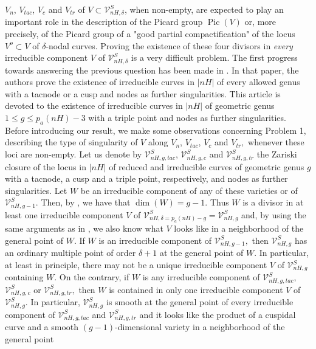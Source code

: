 \documentclass[plain]{amsart}
\def\Pic{\operatorname{Pic}}
\begin{document}
$V_{n}$, $V_{tac}$, $V_{c}$ and $V_{tr}$ of $V\subset \mathcal V_{nH,\delta}^S$, when non-empty,
are expected to play an important role in the description of the Picard group $\Pic(V)$ or, more precisely,
of the Picard group of a "good partial compactification" of the locus $V^o\subset V$ of $\delta$-nodal curves.  
Proving the existence of these four divisors in {\em every} irreducible component $V$ of  $\mathcal V_{nH,\delta}^S$
is a very difficult problem. The first progress towards answering the previous question has been made in \cite{galati-knutsen}.
In that paper, the authors prove the existence of irreducible curves in $|nH|$ of every allowed genus with a tacnode or a cusp
and nodes as further singularities.  This article is devoted to the existence of irreducible curves in $|nH|$ of geometric genus 
$1\leq g\leq p_a(nH)-3$ with a triple point and nodes as further singularities.  Before introducing our result,
we make some observations concerning Problem 1, describing the type of singularity of $V$ along
$V_{n}$, $V_{tac}$, $V_{c}$ and $V_{tr},$ whenever  these loci are non-empty.
Let us denote by  $\mathcal V_{nH,g,tac}^S$, $\mathcal V_{nH,g,c}^S$ and
$\mathcal V_{nH,g,tr}^S$ the Zariski closure of the locus in $|nH|$ of reduced and irreducible curves of geometric genus $g$
with a tacnode,  a cusp and a triple point, respectively, and nodes as further singularities. Let $W$ be an irreducible component 
of any of these varieties or of $\mathcal V_{nH,g-1}^S.$ Then, by
\cite[Lemma 3.1]{C}, we have that
$\dim(W) =g-1.$ Thus $W$ is a divisor in at least one irreducible component $V$ of 
$\mathcal V_{nH,\delta=p_a(nH)-g}^S=\mathcal V_{nH,g}^S$ and, by using the same arguments as 
in \cite[Section 1]{diaz_harris}, we also know what $V$
looks like in a neighborhood of the general point of $W.$  If $W$ is an irreducible component 
of $\mathcal V_{nH,g-1}^S,$ then $\mathcal V_{nH,g}^S$ has an ordinary multiple point of order $\delta+1$
at the general point of $W.$ In particular, at least in principle, there may not be a unique irreducible component $V$ of $\mathcal V_{nH,g}^S$ containing $W.$ On the contrary, if $W$ is any irreducible component of 
$\mathcal V_{nH,g,tac}^S$, $\mathcal V_{nH,g,c}^S$ or
$\mathcal V_{nH,g,tr}^S,$
then $W$ is contained in only one irreducible
component $V$ of $\mathcal V_{nH,g}^S$. 
In particular, $\mathcal V_{nH,g}^S$ is smooth at the general point of every irreducible 
component of $\mathcal V_{nH,g,tac}^S$ and $\mathcal V_{nH,g,tr}^S$ and it looks like 
the product of a cuspidal curve and a smooth $(g-1)$-dimensional variety in a neighborhood of the general point
\end{document}

